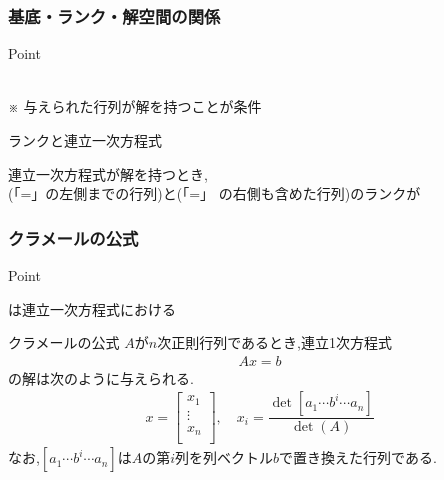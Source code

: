 \documentclass[a4paper]{jsarticle}
\begin{document}
\subsubsection{基底・ランク・解空間の関係}
\begin{itembox}[l]{Point}
    \begin{center}
        \\
        ※ 与えられた行列が解を持つことが条件\\
    \end{center}
\end{itembox}
\begin{itembox}[l]{ランクと連立一次方程式}
    \begin{center}
        連立一次方程式が解を持つとき,\\
        (「=」の左側までの行列)と(「=」 の右側も含めた行列)のランクが
    \end{center}
\end{itembox}
\subsubsection{クラメールの公式}
\begin{itembox}[l]{Point}
    \begin{center}
        は連立一次方程式における
    \end{center}
\end{itembox}
\begin{itembox}[l]{クラメールの公式}
    $A$が$n$次正則行列であるとき,連立1次方程式
    \begin{eqnarray*}
        Ax=b
    \end{eqnarray*}
    の解は次のように与えられる.
    \begin{eqnarray*}
        x=
        \begin{bmatrix}
            x_1    \\
            \vdots \\
            x_n    \\
        \end{bmatrix}
        , \quad
        x_i=\dfrac{\det \left[a_1\cdots b^i\cdots a_n\right]}{\det \left(A\right)}
    \end{eqnarray*}
    なお,$\left[a_1\cdots b^i\cdots a_n\right]$は$A$の第$i$列を列ベクトル$b$で置き換えた行列である.
\end{itembox}
\end{document}
